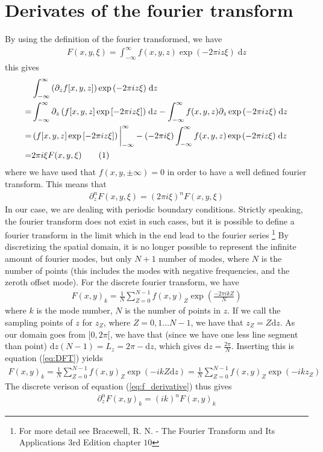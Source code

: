 \documentclass[12pt]{article}
\def\L{\left}
\def\R{\right}
\newcommand{\defi}[4]{\int_{#1}^{#2} {#3} \; \text{d} {#4}} %
\newcommand\numberthis{\addtocounter{equation}{1}\tag{\theequation}}
\begin{document}
\section{Derivates of the fourier transform}
%
\label{sec:deriv_of_FT}
%
By using the definition of the fourier transformed, we have
%
\begin{align*}
    F(x,y,\xi) = \defi{-\infty}{\infty}{f(x,y,z)\exp\L(-2\pi iz\xi\R)}{z}
\end{align*}
%
this gives
%
\begin{align*}
    &\defi{-\infty}{\infty}{\L(\partial_zf[x,y,z]\R)\exp\L(-2\pi iz\xi\R)}{z}\\
%
    =& \defi{-\infty}{\infty}{\partial_z\L(f[x,y,z]\exp\L[-2\pi iz\xi\R]\R)}{z}
    - \defi{-\infty}{\infty}{f(x,y,z)\partial_z\exp\L(-2\pi iz\xi\R)}{z}\\
%
    =& \L(f[x,y,z]\exp\L[-2\pi iz\xi\R]\R)\bigg|_{-\infty}^{\infty} - \L(-2\pi
    i\xi\R)\defi{-\infty}{\infty}{f(x,y,z)\exp\L(-2\pi iz\xi\R)}{z}\\
%
    =& 2\pi i\xi F(x,y,\xi) \numberthis
%
\label{eq:f_derivative}
%
\end{align*}
%
where we have used that $f(x,y,\pm\infty)=0$ in order to have a well defined
fourier transform. This means that
%
\begin{align*}
    \partial_z^n F(x,y,\xi) = (2\pi i \xi)^n F(x,y,\xi)
\end{align*}
%
In our case, we are dealing with periodic boundary conditions. Strictly
speaking, the fourier transform does not exist in such cases, but it is
possible to define a fourier transform in the limit which in the end lead to
the fourier series
%
\footnote{For more detail see Bracewell, R. N. - The Fourier Transform and Its
Applications 3rd Edition chapter $10$}
%
By discretizing the spatial domain, it is no longer possible to represent the
infinite amount of fourier modes, but only $N+1$ number of modes, where $N$ is
the number of points (this includes the modes with negative frequencies, and
the zeroth offset mode). For the discrete fourier transform, we have
%
\begin{align}
    F(x,y)_{k} = \frac{1}{N}\sum_{Z=0}^{N-1}f(x,y)_{Z}\exp\L(\frac{-2\pi i k
    Z}{N}\R)
%
\label{eq:DFT}
%
\end{align}
%
where $k$ is the mode number, $N$ is the number of points in $z$. If we call
the sampling points of $z$ for $z_Z$, where $Z = 0, 1 \ldots N-1$, we have that
$z_Z = Z \text{d}z$. As our domain goes from $[0, 2\pi[$, we have that (since
        we have one less line segment than point) $\text{d}z (N-1) = L_z = 2\pi
        - \text{d}z$, which gives $\text{d}z = \frac{2\pi}{N}$. Inserting this
        is equation (\ref{eq:DFT}) yields
%
\begin{align*}
    F(x,y)_{k} = \frac{1}{N}\sum_{Z=0}^{N-1}f(x,y)_{Z}\exp\L( - i k
    Z\text{d}z\R) = \frac{1}{N}\sum_{Z=0}^{N-1}f(x,y)_{Z}\exp\L( - i k z_Z\R)
\end{align*}
%
The discrete verison of equation (\ref{eq:f_derivative}) thus gives
%
\begin{align*}
    \partial_z^n F(x,y)_k = (i k)^n F(x,y)_k
\end{align*}
%
\printindex
\end{document}
